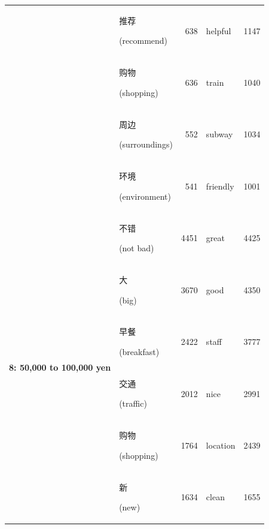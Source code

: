 \documentclass[smallextended,natbib]{svjour3}       %
\begin{document}
\begin{table}[ht]
{\begin{tabular}{|c|lr|lr|}
                                                             & \begin{CJK}{UTF8}{gbsn}推荐\end{CJK} (recommend)       & 638   & helpful     & 1147  \\  
                                                             & \begin{CJK}{UTF8}{gbsn}购物\end{CJK} (shopping)        & 636   & train       & 1040  \\  
                                                             & \begin{CJK}{UTF8}{gbsn}周边\end{CJK} (surroundings)    & 552   & subway      & 1034  \\  
                                                             & \begin{CJK}{UTF8}{gbsn}环境\end{CJK} (environment)    & 541   & friendly    & 1001  \\ \hline
        \multirow{10}{*}{\textbf{8: 50,000 to 100,000 yen}}  & \begin{CJK}{UTF8}{gbsn}不错\end{CJK} (not bad)         & 4451  & great       & 4425  \\  
                                                             & \begin{CJK}{UTF8}{gbsn}大\end{CJK} (big)              & 3670  & good        & 4350  \\  
                                                             & \begin{CJK}{UTF8}{gbsn}早餐\end{CJK} (breakfast)       & 2422  & staff       & 3777  \\  
                                                             & \begin{CJK}{UTF8}{gbsn}交通\end{CJK} (traffic)         & 2012  & nice        & 2991  \\  
                                                             & \begin{CJK}{UTF8}{gbsn}购物\end{CJK} (shopping)        & 1764  & location    & 2439  \\  
                                                             & \begin{CJK}{UTF8}{gbsn}新\end{CJK} (new)              & 1634  & clean       & 1655  \\  

\end{tabular}}
\end{table}
\end{document}
